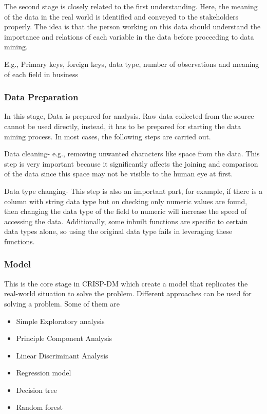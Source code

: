\documentclass[
]{article}
\begin{document}
The second stage is closely related to the first understanding. Here,
the meaning of the data in the real world is identified and conveyed to
the stakeholders properly. The idea is that the person working on this
data should understand the importance and relations of each variable in
the data before proceeding to data mining.

E.g., Primary keys, foreign keys, data type, number of observations and
meaning of each field in business

\hypertarget{data-preparation}{%
\subsubsection{\texorpdfstring{\textbf{Data
Preparation}}{Data Preparation}}\label{data-preparation}}

In this stage, Data is prepared for analysis. Raw data collected from
the source cannot be used directly, instead, it has to be prepared for
starting the data mining process. In most cases, the following steps are
carried out.

Data cleaning- e.g., removing unwanted characters like space from the
data. This step is very important because it significantly affects the
joining and comparison of the data since this space may not be visible
to the human eye at first.

Data type changing- This step is also an important part, for example, if
there is a column with string data type but on checking only numeric
values are found, then changing the data type of the field to numeric
will increase the speed of accessing the data. Additionally, some
inbuilt functions are specific to certain data types alone, so using the
original data type fails in leveraging these functions.

\hypertarget{model}{%
\subsubsection{\texorpdfstring{\textbf{Model}}{Model}}\label{model}}

This is the core stage in CRISP-DM which create a model that replicates
the real-world situation to solve the problem. Different approaches can
be used for solving a problem. Some of them are

\begin{itemize}
\item
  Simple Exploratory analysis
\item
  Principle Component Analysis
\item
  Linear Discriminant Analysis
\item
  Regression model
\item
  Decision tree
\item
  Random forest
\end{itemize}
\end{document}

